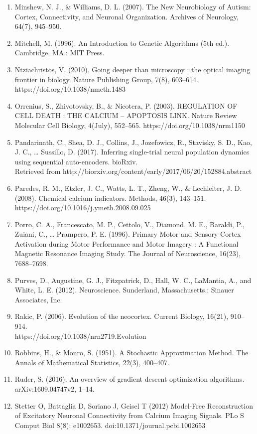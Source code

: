 \documentclass[11pt]{article}
\begin{document}
\begin{enumerate}
\item Minshew, N. J., \& Williams, D. L. (2007). The New Neurobiology of Autism: Cortex, Connectivity, and Neuronal Organization. Archives of Neurology, 64(7), 945–950.
\item Mitchell, M. (1996). An Introduction to Genetic Algorithms (5th ed.). Cambridge, MA.: MIT Press.
\item Ntziachristos, V. (2010). Going deeper than microscopy : the optical imaging frontier in biology. Nature Publishing Group, 7(8), 603–614. https://doi.org/10.1038/nmeth.1483
\item Orrenius, S., Zhivotovsky, B., \& Nicotera, P. (2003). REGULATION OF CELL DEATH : THE CALCIUM – APOPTOSIS LINK. Nature Review Molecular Cell Biology, 4(July), 552–565. https://doi.org/10.1038/nrm1150
\item Pandarinath, C., Shea, D. J., Collins, J., Jozefowicz, R., Stavisky, S. D., Kao, J. C., … Sussillo, D. (2017). Inferring single-trial neural population dynamics using sequential auto-encoders. bioRxiv.\\Retrieved from http://biorxiv.org/content/early/2017/06/20/152884.abstract
\item Paredes, R. M., Etzler, J. C., Watts, L. T., Zheng, W., \& Lechleiter, J. D. (2008). Chemical calcium indicators. Methods, 46(3), 143–151. https://doi.org/10.1016/j.ymeth.2008.09.025
\item Porro, C. A., Francescato, M. P., Cettolo, V., Diamond, M. E., Baraldi, P., Zuiani, C., … Prampero, P. E. (1996). Primary Motor and Sensory Cortex Activation during Motor Performance and Motor Imagery : A Functional Magnetic Resonance Imaging Study. The Journal of Neuroscience, 16(23), 7688–7698.
\item Purves, D., Augustine, G. J., Fitzpatrick, D., Hall, W. C., LaMantia, A., and White, L. E. (2012). Neuroscience. Sunderland, Massachusetts.: Sinauer Associates, Inc.
\item Rakic, P. (2006). Evolution of the neocortex. Current Biology, 16(21), 910–914. \\https://doi.org/10.1038/nrn2719.Evolution
\item Robbins, H., \& Monro, S. (1951). A Stochastic Approximation Method. The Annals of Mathematical Statistics, 22(3), 400–407.
\item Ruder, S. (2016). An overview of gradient descent optimization algorithms.\\ arXiv:1609.04747v2, 1–14.
\item Stetter  O,  Battaglia  D,  Soriano  J,  Geisel  T  (2012)  Model-Free  Reconstruction  of  Excitatory  Neuronal  Connectivity  from  Calcium  Imaging  Signals.  PLo S Comput  Biol  8(8):  e1002653. doi:10.1371/journal.pcbi.1002653

\end{enumerate}
\end{document}

